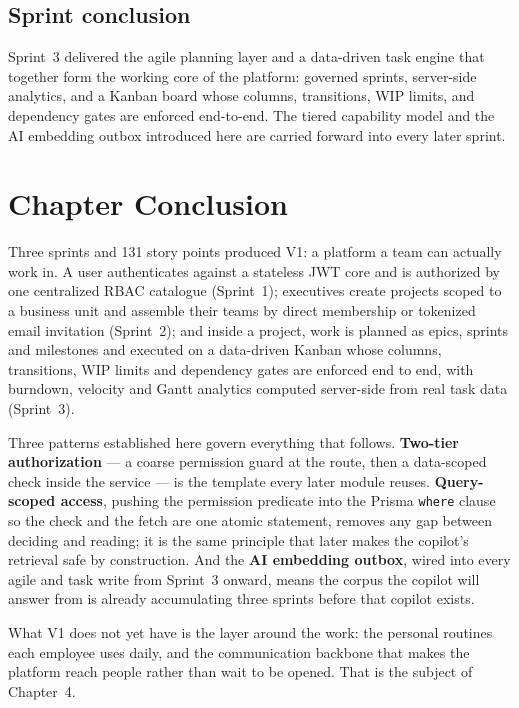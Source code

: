 
\subsection{Sprint conclusion}

Sprint~3 delivered the agile planning layer and a data-driven task engine that together form the
working core of the platform: governed sprints, server-side analytics, and a Kanban board whose
columns, transitions, WIP limits, and dependency gates are enforced end-to-end. The tiered
capability model and the AI embedding outbox introduced here are carried forward into every
later sprint.

\section{Chapter Conclusion}

Three sprints and 131 story points produced V1: a platform a team can actually work in. A user
authenticates against a stateless JWT core and is authorized by one centralized RBAC catalogue
(Sprint~1); executives create projects scoped to a business unit and assemble their teams by
direct membership or tokenized email invitation (Sprint~2); and inside a project, work is planned
as epics, sprints and milestones and executed on a data-driven Kanban whose columns, transitions,
WIP limits and dependency gates are enforced end to end, with burndown, velocity and Gantt
analytics computed server-side from real task data (Sprint~3).

Three patterns established here govern everything that follows. \textbf{Two-tier authorization}
--- a coarse permission guard at the route, then a data-scoped check inside the service --- is
the template every later module reuses. \textbf{Query-scoped access}, pushing the permission
predicate into the Prisma \texttt{where} clause so the check and the fetch are one atomic
statement, removes any gap between deciding and reading; it is the same principle that later
makes the copilot's retrieval safe by construction. And the \textbf{AI embedding outbox}, wired
into every agile and task write from Sprint~3 onward, means the corpus the copilot will answer
from is already accumulating three sprints before that copilot exists.

What V1 does not yet have is the layer around the work: the personal routines each employee uses
daily, and the communication backbone that makes the platform reach people rather than wait to be
opened. That is the subject of Chapter~4.

\fi %
